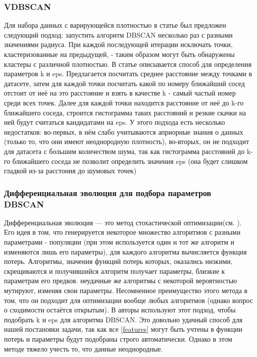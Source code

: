 \documentclass[12pt,fleqn]{article}
\begin{document}
\subsubsection{VDBSCAN}
Для набора данных с варирующейся плотностью в статье \cite{VDBSCAN} был предложен следующий подход: запустить алгоритм DBSCAN несколько раз с разными значениями радиуса. При каждой последующей итерации исключать точки, кластеризованные на предыдущей, - таким образом могут быть обнаружены кластеры с различной плотностью. В статье \cite{AutoVDBSCAN} описывается способ для определения параметров k и eps. Предлагается посчитать среднее расстояние между точками в датасете, затем для каждой точки посчитать какой по номеру ближайший сосед отстоит от неё на это расстояние и взять в качестве
k - самый частый номер среди всех точек. Далее для каждой точки находится расстояние от неё до k-го ближайшего соседа, строится гистограмма таких расстояний и резкие скачки на ней будут считаться кандидатами на eps.
У этого подхода есть несколько недостатков: во-первых, в нём слабо учитываются априорные знания о данных (только то, что они имеют неоднородную плотность), во-вторых, он не подходит для датасета с большим количеством шума, так как гистограмма расстояний до k-го ближайшего соседа не позволит определить значения eps (она будет слишком гладкой из-за расстония до шумовых точек)

\subsubsection{Дифференциальная эволюция для подбора параметров DBSCAN}
Дифференциальная эволюция --- это метод стохастической оптимизации(см. \cite{dif_evol}). Его идея в том, что генерируется некоторое множество алгоритмов с разными параметрами - популяции (при этом используется один и тот же алгоритм и изменяются лишь его параметры), для каждого алгоритма вычисляется функция потерь. Алгоритмы, значения функций потерь которых, оказались низкими, скрещиваются и получившийся алгоритм получает параметры, близкие к параметрам его предков. неудачные же алгоритмы с некоторой вероятностью мутируют, изменяя свои параметры. Несомненное преимущество этого метода в том, что он подходит для оптимизации вообще любых алгоритмов (однако вопрос о сходимости остаётся открытым). В \cite{BDE-DBSCAN} авторы используют этот подход, чтобы подобрать k и eps для алгоритма DBSCAN. Это довольно удачный способ для нашей постановки задачи, так как все \ref{features} могут быть учтены в функции потерь и параметры будут подобраны строго автоматически. Однако в этом методе тяжело учесть то, что данные неоднородные.
\end{document}
